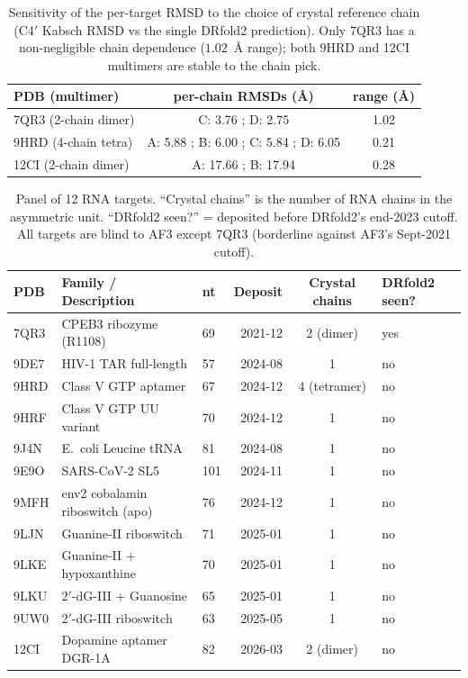 \documentclass[11pt,a4paper]{article}
\begin{document}
\begin{table}[h!]
\centering
\caption{Sensitivity of the per-target RMSD to the choice of crystal
reference chain (C4$'$ Kabsch RMSD vs the single DRfold2 prediction).
Only 7QR3 has a non-negligible chain dependence ($1.02$~\AA{} range);
both 9HRD and 12CI multimers are stable to the chain pick.}
\label{tab:chain_robust}
\small
\begin{tabular}{lcc}
\toprule
PDB (multimer)        & per-chain RMSDs (\AA{})  & range (\AA{}) \\
\midrule
7QR3 (2-chain dimer)  & C: 3.76 ; D: 2.75        & 1.02 \\
9HRD (4-chain tetra)  & A: 5.88 ; B: 6.00 ; C: 5.84 ; D: 6.05 & 0.21 \\
12CI (2-chain dimer)  & A: 17.66 ; B: 17.94      & 0.28 \\
\bottomrule
\end{tabular}
\end{table}

\begin{table}[h!]
\centering
\caption{Panel of 12 RNA targets. ``Crystal chains'' is the number of
RNA chains in the asymmetric unit. ``DRfold2 seen?'' = deposited
before DRfold2's end-2023 cutoff. All targets are blind to AF3 except
7QR3 (borderline against AF3's Sept-2021 cutoff).}
\label{tab:targets}
\small
\begin{tabular}{lllrcl}
\toprule
PDB & Family / Description & nt & Deposit & Crystal chains & DRfold2 seen? \\
\midrule
7QR3 & CPEB3 ribozyme (R1108)              & 69  & 2021-12 & 2 (dimer)   & yes \\
9DE7 & HIV-1 TAR full-length                & 57  & 2024-08 & 1            & no \\
9HRD & Class V GTP aptamer                  & 67  & 2024-12 & 4 (tetramer) & no \\
9HRF & Class V GTP UU variant               & 70  & 2024-12 & 1            & no \\
9J4N & E.~coli Leucine tRNA                 & 81  & 2024-08 & 1            & no \\
9E9O & SARS-CoV-2 SL5                       & 101 & 2024-11 & 1            & no \\
9MFH & env2 cobalamin riboswitch (apo)      & 76  & 2024-12 & 1            & no \\
9LJN & Guanine-II riboswitch                & 71  & 2025-01 & 1            & no \\
9LKE & Guanine-II + hypoxanthine            & 70  & 2025-01 & 1            & no \\
9LKU & 2$'$-dG-III + Guanosine              & 65  & 2025-01 & 1            & no \\
9UW0 & 2$'$-dG-III riboswitch               & 63  & 2025-05 & 1            & no \\
12CI & Dopamine aptamer DGR-1A              & 82  & 2026-03 & 2 (dimer)    & no \\
\bottomrule
\end{tabular}
\end{table}
\end{document}
